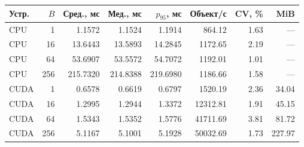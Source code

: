 \begin{tabular}{lrrrrrrr}
\toprule
Устр. & $B$ & Сред., мс & Мед., мс & $p_{95}$, мс & Объект/с & CV, \% & MiB \\
\midrule
CPU & 1 & 1.1572 & 1.1524 & 1.1914 & 864.12 & 1.63 & --- \\
CPU & 16 & 13.6443 & 13.5893 & 14.2845 & 1172.65 & 2.19 & --- \\
CPU & 64 & 53.6907 & 53.5572 & 54.7072 & 1192.01 & 1.01 & --- \\
CPU & 256 & 215.7320 & 214.8388 & 219.6980 & 1186.66 & 1.58 & --- \\
CUDA & 1 & 0.6578 & 0.6619 & 0.6797 & 1520.19 & 2.36 & 34.04 \\
CUDA & 16 & 1.2995 & 1.2944 & 1.3372 & 12312.81 & 1.91 & 45.15 \\
CUDA & 64 & 1.5343 & 1.5352 & 1.5776 & 41711.69 & 3.81 & 81.72 \\
CUDA & 256 & 5.1167 & 5.1001 & 5.1928 & 50032.69 & 1.73 & 227.97 \\
\bottomrule
\end{tabular}
